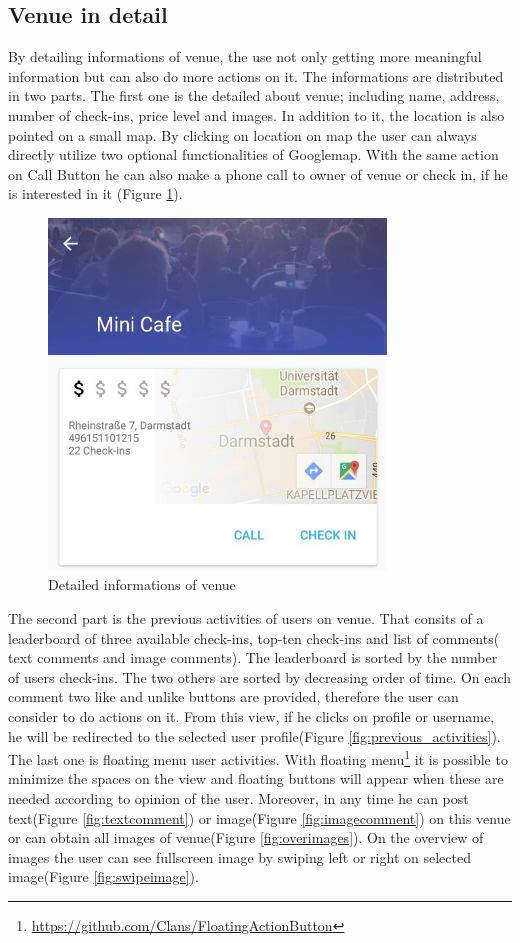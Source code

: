  
\subsection{Venue in detail}
By detailing informations of venue, the use not only getting more meaningful information but can also do more actions on it. The informations are distributed in two parts. The first one is the detailed about venue; including name, address, number of check-ins, price level and images.
In addition to it, the location is also pointed on a small map. By clicking on location on map the user can always directly utilize two optional functionalities of Googlemap. With the same action on Call Button he can also make a phone call to owner of venue or check in, if he is interested in it (Figure \ref{fig:detailedInformationsOfVenue}). 
\begin{figure}[htbp]
	\includegraphics[width=0.8\textwidth]{images/venueInDetail_Part_1.jpg}
	\centering
	\caption[]{Detailed informations of venue}
	\label{fig:detailedInformationsOfVenue}
\end{figure}

The second part is the previous activities of users on venue. That consits of a leaderboard of three available check-ins, top-ten check-ins and list of comments( text comments and image comments). The leaderboard is sorted by the number of users check-ins. The two others are sorted by decreasing order of time. On each comment two like and unlike buttons are provided, therefore the user can consider to do actions on it. From this view, if he clicks on profile or username, he will be redirected to the selected user profile(Figure \ref{fig:previous_activities}). 
The last one is floating menu user activities. With floating menu\footnote{\url{https://github.com/Clans/FloatingActionButton}} it is possible to minimize the spaces on the view and floating buttons will appear when these are needed according to opinion of the user. Moreover, in any time he can post text(Figure \ref{fig:textcomment}) or image(Figure \ref{fig:imagecomment}) on this venue or can obtain all images of venue(Figure \ref{fig:overimages}). On the overview of images the user can see fullscreen image by swiping left or right on selected image(Figure \ref{fig:swipeimage}).

